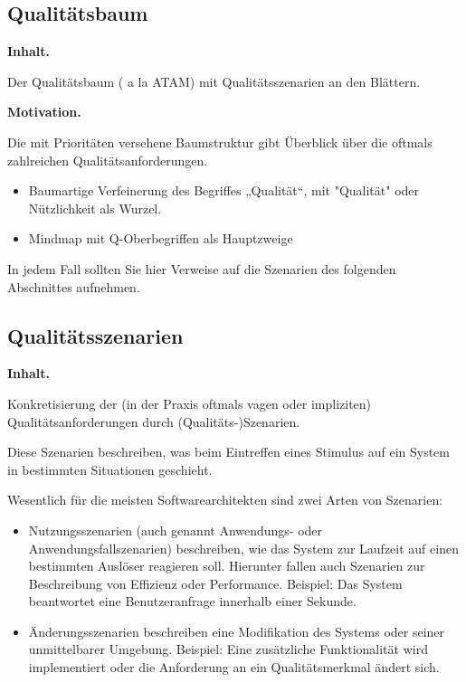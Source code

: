 \documentclass[]{article}
\begin{document}
\subsection{Qualitätsbaum}\label{_qualit_tsbaum}

\textbf{Inhalt.}

Der Qualitätsbaum ( a la ATAM) mit Qualitätsszenarien an den Blättern.

\textbf{Motivation.}

Die mit Prioritäten versehene Baumstruktur gibt Überblick über die
oftmals zahlreichen Qualitätsanforderungen.

\begin{itemize}
\item
  Baumartige Verfeinerung des Begriffes „Qualität``, mit "Qualität" oder
  Nützlichkeit als Wurzel.
\item
  Mindmap mit Q-Oberbegriffen als Hauptzweige
\end{itemize}

In jedem Fall sollten Sie hier Verweise auf die Szenarien des folgenden
Abschnittes aufnehmen.

\subsection{Qualitätsszenarien}\label{_qualit_tsszenarien}

\textbf{Inhalt.}

Konkretisierung der (in der Praxis oftmals vagen oder impliziten)
Qualitätsanforderungen durch (Qualitäts-)Szenarien.

Diese Szenarien beschreiben, was beim Eintreffen eines Stimulus auf ein
System in bestimmten Situationen geschieht.

Wesentlich für die meisten Softwarearchitekten sind zwei Arten von
Szenarien:

\begin{itemize}
\item
  Nutzungsszenarien (auch genannt Anwendungs- oder
  Anwendungsfallszenarien) beschreiben, wie das System zur Laufzeit auf
  einen bestimmten Auslöser reagieren soll. Hierunter fallen auch
  Szenarien zur Beschreibung von Effizienz oder Performance. Beispiel:
  Das System beantwortet eine Benutzeranfrage innerhalb einer Sekunde.
\item
  Änderungsszenarien beschreiben eine Modifikation des Systems oder
  seiner unmittelbarer Umgebung. Beispiel: Eine zusätzliche
  Funktionalität wird implementiert oder die Anforderung an ein
  Qualitätsmerkmal ändert sich.
\end{itemize}
\end{document}
